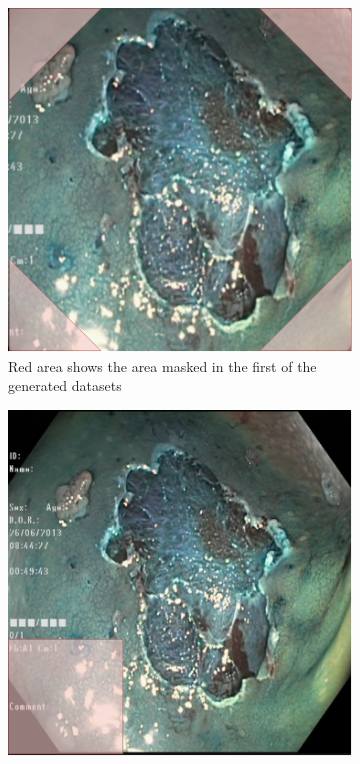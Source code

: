 \begin{figure}[h]
\begin{subfigure}[t]{0.37\textwidth}
         \centering
         \includegraphics[width=\textwidth]{methodology/figures/cornermask.png}
         \caption{Red area shows the area masked in the first of the generated datasets}
         \label{fig:CornerMask}
     \end{subfigure}
     \begin{subfigure}[t]{0.37\textwidth}
         \centering
         \includegraphics[width=\textwidth]{methodology/figures/greenmask.png}

\end{subfigure}
\end{figure}
